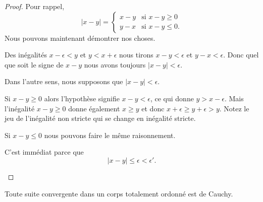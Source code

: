\begin{proof}
    Pour rappel,
    \begin{equation}
        | x-y |=\begin{cases}
               x-y    &     \text{si } x-y\geq 0 \\
                    y-x    &    \text{si } x-y\leq 0.
               \end{cases}
    \end{equation}
    Nous pouvons maintenant démontrer nos choses.
    \begin{subproof}
        \item[\ref{ITEMooXJGVooSebiip}]
            Des inégalités \( x-\epsilon<y\) et \( y<x+\epsilon\) nous tirons \( x-y<\epsilon\) et \( y-x<\epsilon\). Donc quel que soit le signe de \( x-y\) nous avons toujours \( | x-y |<\epsilon\).

            Dans l'autre sens, nous supposons que \( | x-y |<\epsilon\).

            Si \( x-y\geq 0\) alors l'hypothèse signifie \( x-y<\epsilon\), ce qui donne \( y>x-\epsilon\). Mais l'inégalité \( x-y\geq 0\) donne également \( x\geq y\) et donc \( x+\epsilon\geq y+\epsilon>y\). Notez le jeu de l'inégalité non stricte qui se change en inégalité stricte.

            Si \( x-y\leq 0\) nous pouvons faire le même raisonnement.

        \item[\ref{ITEMooRUBBooRayiMs}]

            C'est immédiat parce que
            \begin{equation}
                | x-y |\leq \epsilon<\epsilon'.
            \end{equation}
    \end{subproof}
\end{proof}

\begin{proposition}     \label{PROPooTFVOooFoSHPg}
    Toute suite convergente dans un corps totalement ordonné est de Cauchy.
\end{proposition}

